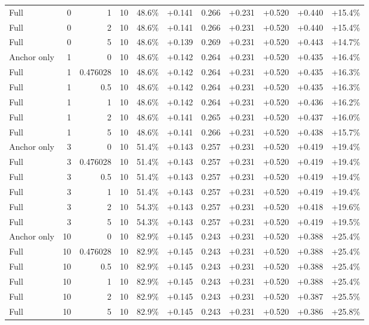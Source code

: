 \begin{table}[htbp]
\begin{tabular}{lrrrccccccc}
Full & 0 & 1 & 10 & 48.6\% & +0.141 & 0.266 & +0.231 & +0.520 & +0.440 & +15.4\% \\
Full & 0 & 2 & 10 & 48.6\% & +0.141 & 0.266 & +0.231 & +0.520 & +0.440 & +15.4\% \\
Full & 0 & 5 & 10 & 48.6\% & +0.139 & 0.269 & +0.231 & +0.520 & +0.443 & +14.7\% \\
Anchor only & 1 & 0 & 10 & 48.6\% & +0.142 & 0.264 & +0.231 & +0.520 & +0.435 & +16.4\% \\
Full & 1 & 0.476028 & 10 & 48.6\% & +0.142 & 0.264 & +0.231 & +0.520 & +0.435 & +16.3\% \\
Full & 1 & 0.5 & 10 & 48.6\% & +0.142 & 0.264 & +0.231 & +0.520 & +0.435 & +16.3\% \\
Full & 1 & 1 & 10 & 48.6\% & +0.142 & 0.264 & +0.231 & +0.520 & +0.436 & +16.2\% \\
Full & 1 & 2 & 10 & 48.6\% & +0.141 & 0.265 & +0.231 & +0.520 & +0.437 & +16.0\% \\
Full & 1 & 5 & 10 & 48.6\% & +0.141 & 0.266 & +0.231 & +0.520 & +0.438 & +15.7\% \\
Anchor only & 3 & 0 & 10 & 51.4\% & +0.143 & 0.257 & +0.231 & +0.520 & +0.419 & +19.4\% \\
Full & 3 & 0.476028 & 10 & 51.4\% & +0.143 & 0.257 & +0.231 & +0.520 & +0.419 & +19.4\% \\
Full & 3 & 0.5 & 10 & 51.4\% & +0.143 & 0.257 & +0.231 & +0.520 & +0.419 & +19.4\% \\
Full & 3 & 1 & 10 & 51.4\% & +0.143 & 0.257 & +0.231 & +0.520 & +0.419 & +19.4\% \\
Full & 3 & 2 & 10 & 54.3\% & +0.143 & 0.257 & +0.231 & +0.520 & +0.418 & +19.6\% \\
Full & 3 & 5 & 10 & 54.3\% & +0.143 & 0.257 & +0.231 & +0.520 & +0.419 & +19.5\% \\
Anchor only & 10 & 0 & 10 & 82.9\% & +0.145 & 0.243 & +0.231 & +0.520 & +0.388 & +25.4\% \\
Full & 10 & 0.476028 & 10 & 82.9\% & +0.145 & 0.243 & +0.231 & +0.520 & +0.388 & +25.4\% \\
Full & 10 & 0.5 & 10 & 82.9\% & +0.145 & 0.243 & +0.231 & +0.520 & +0.388 & +25.4\% \\
Full & 10 & 1 & 10 & 82.9\% & +0.145 & 0.243 & +0.231 & +0.520 & +0.388 & +25.4\% \\
Full & 10 & 2 & 10 & 82.9\% & +0.145 & 0.243 & +0.231 & +0.520 & +0.387 & +25.5\% \\
Full & 10 & 5 & 10 & 82.9\% & +0.145 & 0.243 & +0.231 & +0.520 & +0.386 & +25.8\% \\

\end{tabular}
\end{table}
